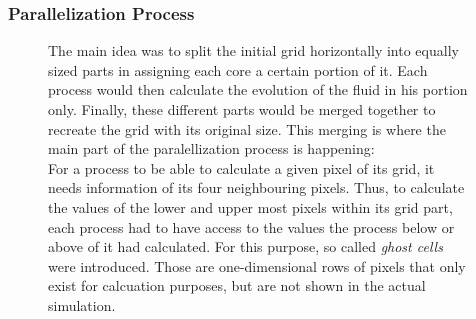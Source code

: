 \documentclass[12pt, a4paper, titlepage]{article}
\newcommand{\vp}{\vspace{1cm}}
\begin{document}
{\vp
\subsubsection{Parallelization Process}

\begin{figure}[h!]
	\begin{minipage}{0.7\linewidth}
		The main idea was to split the initial grid horizontally into equally sized parts in assigning each core a certain portion of it. Each process would then calculate the evolution of the fluid in his portion only. Finally, these different parts would be merged together to recreate the grid with its original size. This merging is where the main part of the paralellization process is happening:\\
For a process to be able to calculate a given pixel of its grid, it needs information of its four neighbouring pixels. Thus, to calculate the values of the lower and upper most pixels within its grid part, each process had to have access to the values the process below or above of it had calculated. For this purpose, so called \textit{ghost cells} were introduced. Those are one-dimensional rows of pixels that only exist for calcuation purposes, but are not shown in the actual simulation.
	\end{minipage}	
	\hfill
	\begin{minipage}{0.28\linewidth}
\end{minipage}
\end{figure}}
\end{document}

